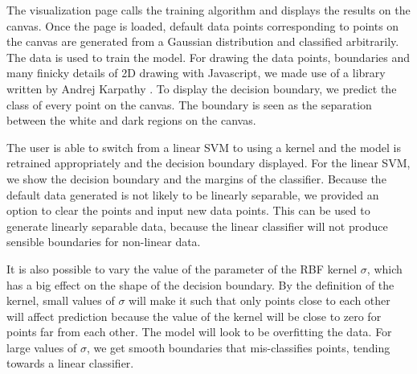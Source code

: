 \documentclass[11pt,letterpaper]{article}
\begin{document}
The visualization page calls the training algorithm and displays the results on the canvas. Once the page is loaded, default data points corresponding to points on the canvas are generated from a Gaussian distribution and classified arbitrarily. The data is used to train the model. For drawing the data points, boundaries and many finicky details of 2D drawing with Javascript, we made use of a library written by Andrej Karpathy \cite{Andrej}. To display the decision boundary, we predict the class of every point on the canvas. The boundary is seen as the separation between the white and dark regions on the canvas.

The user is able to switch from a linear SVM to using a kernel and the model is retrained appropriately and the decision boundary displayed. For the linear SVM, we show the decision boundary and the margins of the classifier. Because the default data generated is not likely to be linearly separable, we provided an option to clear the points and input new data points. This can be used to generate linearly separable data, because the linear classifier will not produce sensible boundaries for non-linear data.

It is also possible to vary the value of the parameter of the RBF kernel $\sigma$, which has a big effect on the shape of the decision boundary. By the definition of the kernel, small values of $\sigma$ will make it such that only points close to each other will affect prediction because the value of the kernel will be close to zero for points far from each other. The model will look to be overfitting the data. For large values of $\sigma$, we get smooth boundaries that mis-classifies points, tending towards a linear classifier.
\end{document}
